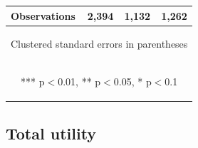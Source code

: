 \documentclass{article} %
\begin{document}
\begin{table}[H]
\begin{center}
\begin{tabular}{lccc}
 Observations & 2,394 & 1,132 & 1,262 \\ \hline
\multicolumn{4}{c}{\begin{footnotesize} Clustered standard errors in parentheses\end{footnotesize}} \\
\multicolumn{4}{c}{\begin{footnotesize} *** p$<$0.01, ** p$<$0.05, * p$<$0.1\end{footnotesize}} \\
\end{tabular}
\end{center}

\end{table}



\subsection{Total utility}
\end{document}
